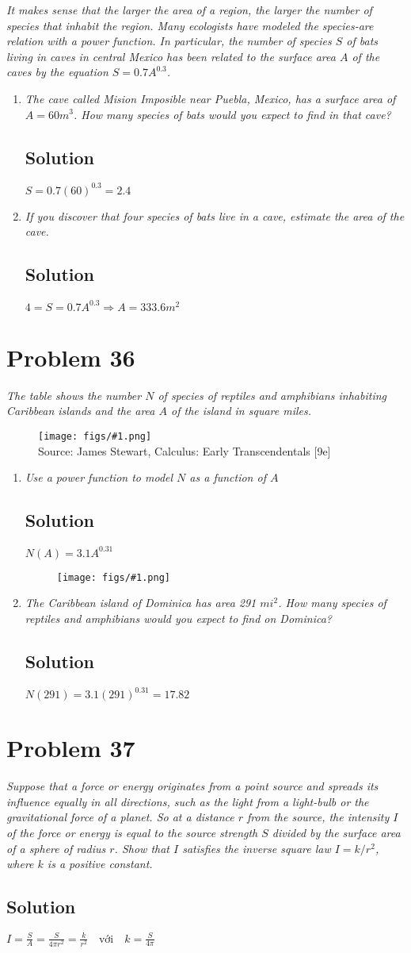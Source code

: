 \documentclass[11pt]{article}
\newcommand{\soln}{\subsection*}
\newcommand{\qn}{\textit}
\newcommand{\imagesource}[1]{{\footnotesize Source: #1}}
\newcommand{\imgqn}[1]{
	\begin{figure}[H]
		\centering
		\texttt{[image: figs/\#1.png]}\\
		\imagesource{James Stewart, Calculus: Early Transcendentals [9e]}
	\end{figure}
}
\newcommand{\imgsoln}[1]{
	\begin{figure}[H]
		\centering
		\texttt{[image: figs/\#1.png]}
	\end{figure}
}
\begin{document}
\qn{It makes sense that the larger the area of a region, the larger the number of species that inhabit the region. Many ecologists have modeled the species-are relation with a power function. In particular, the number of species $S$ of bats living in caves in central Mexico has been related to the surface area $A$ of the caves by the equation $S=0.7A^{0.3}$.}

\begin{enumerate}
	\item \qn{The cave called Mision Imposible near Puebla, Mexico, has a surface area of $A=60m^3$. How many species of bats would you expect to find in that cave?}
	\soln{Solution}
	$S=0.7(60)^{0.3}=2.4$
	
	\item \qn{If you discover that four species of bats live in a cave, estimate the area of the cave.}
	\soln{Solution}
	$4=S=0.7A^{0.3} \Rightarrow A=333.6m^2$
\end{enumerate}

\section*{Problem 36}

\qn{The table shows the number $N$ of species of reptiles and amphibians inhabiting Caribbean islands and the area $A$ of the island in square miles.}

\imgqn{1.2.36}

\begin{enumerate}
	\item \qn{Use a power function to model $N$ as a function of $A$}
	\soln{Solution}
	$N(A)=3.1A^{0.31}$
	\imgsoln{1.2.36-ans.a}
	
	\item \qn{The Caribbean island of Dominica has area 291 $mi^2$. How many species of reptiles and amphibians would you expect to find on Dominica?}
	\soln{Solution}
	$N(291)=3.1(291)^{0.31}=17.82$
\end{enumerate}

\section*{Problem 37}

\qn{Suppose that a force or energy originates from a point source and spreads its influence equally in all directions, such as the light from a light-bulb or the gravitational force of a planet. So at a distance $r$ from the source, the intensity $I$ of the force or energy is equal to the source strength $S$ divided by the surface area of a sphere of radius $r$. Show that $I$ satisfies the inverse square law $I=k/r^2$, where $k$ is a positive constant.}

\soln{Solution}
$I=\frac{S}{A}=\frac{S}{4\pi{r^2}}=\frac{k}{r^2} \quad \text{với} \quad k=\frac{S}{4\pi}$
\end{document}

